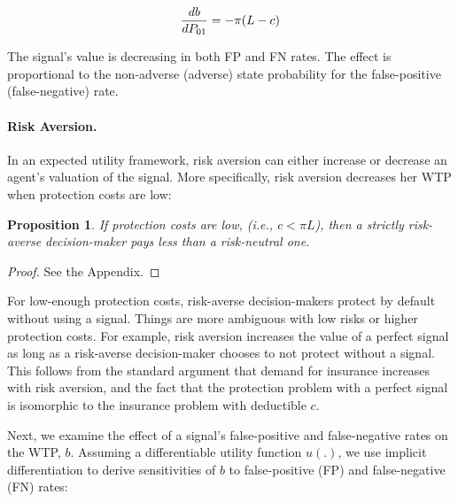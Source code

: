 \documentclass[12pt,a4paper]{article}
\newtheorem{theorem}{Proposition}
\begin{document}
\begin{equation}\label{eq:dWTP_dFN}
{db\over dP_{01}}=-\pi(L-c)
\end{equation}
\vspace{10pt}

The signal's value is decreasing in both FP and FN rates. The effect is proportional to the non-adverse (adverse) state probability for the false-positive (false-negative) rate.

\paragraph{Risk Aversion.} In an expected utility framework, risk aversion can either increase or decrease an agent's valuation of the signal. More specifically, risk aversion decreases her WTP when protection costs are low: 

\begin{theorem}
 If protection costs are low, (i.e., $c<\pi L$), then a strictly risk-averse decision-maker pays less than a risk-neutral one.
\end{theorem} 
\begin{proof}
See the Appendix.
\end{proof}

For low-enough protection costs, risk-averse decision-makers protect by default without using a signal. Things are more ambiguous with low risks or higher protection costs. For example, risk aversion increases the value of a perfect signal as long as a risk-averse decision-maker chooses to not protect without a signal. This follows from the standard argument that demand for insurance increases with risk aversion, and the fact that the protection problem with a perfect signal is isomorphic to the insurance problem with deductible $c$. 

Next, we examine the effect of a signal's false-positive and false-negative rates on the WTP, $b$. Assuming a differentiable utility function $u(.)$, we use implicit differentiation to derive sensitivities of $b$ to false-positive (FP) and false-negative (FN) rates:
\end{document}
